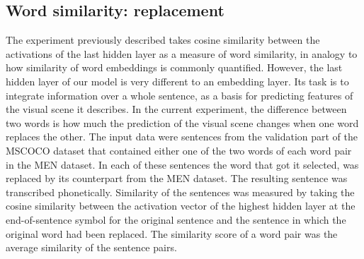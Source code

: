 \subsection{Word similarity: replacement}
The experiment previously described takes cosine similarity between the activations of the last hidden layer as a measure of word similarity, in analogy to how similarity of word embeddings is commonly quantified. However, the last hidden layer of our model is very different to an embedding layer. Its task is to integrate information over a whole sentence, as a basis for predicting features of the visual scene it describes. In the current experiment, the difference between two words is how much the prediction of the visual scene changes when one word replaces the other. %
The input data were sentences from the validation part %
of the MSCOCO dataset that contained either one of the two words of each word pair in the MEN dataset. In each of these sentences %
the word that got it selected, was replaced by its counterpart from the MEN dataset. The resulting sentence was transcribed phonetically. Similarity of the sentences was measured by taking the cosine similarity between the activation vector of the highest hidden layer at the end-of-sentence symbol for the original sentence and the sentence in which the original word had been replaced. The similarity score of a word pair was the average similarity of the sentence pairs. %

